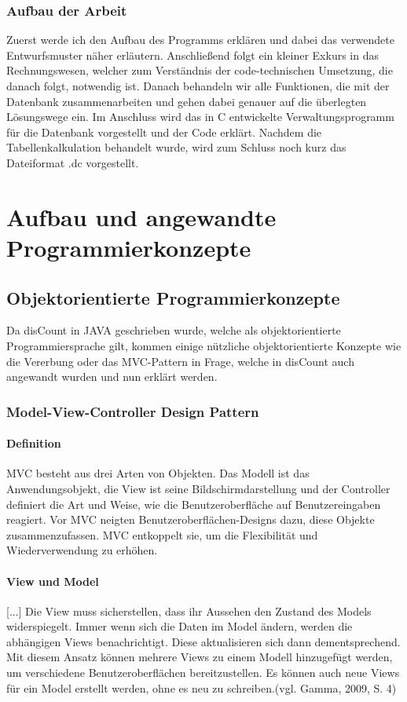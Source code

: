 \documentclass[12pt]{report}
\begin{document}
\section{Aufbau der Arbeit}
Zuerst werde ich den Aufbau des Programms erklären und dabei das verwendete Entwurfsmuster näher erläutern. Anschließend folgt ein kleiner Exkurs in das Rechnungswesen, welcher zum Verständnis der code-technischen Umsetzung, die danach folgt, notwendig ist. Danach behandeln wir alle Funktionen, die mit der Datenbank zusammenarbeiten und gehen dabei genauer auf die überlegten Lösungswege ein. Im Anschluss wird das in C entwickelte Verwaltungsprogramm für die Datenbank vorgestellt und der Code erklärt. Nachdem die Tabellenkalkulation behandelt wurde, wird zum Schluss noch kurz das Dateiformat .dc vorgestellt.


\part{Aufbau und angewandte Programmierkonzepte}
 
\chapter{Objektorientierte Programmierkonzepte}
  
Da disCount in JAVA geschrieben wurde, welche als objektorientierte Programmiersprache gilt, kommen einige nützliche objektorientierte Konzepte wie die Vererbung oder das MVC-Pattern in Frage, welche in disCount auch angewandt wurden und nun erklärt werden.
  
  
\section{Model-View-Controller Design Pattern}
 
\subsection{Definition}
MVC besteht aus drei Arten von Objekten. Das Modell ist das Anwendungsobjekt, die View ist seine Bildschirmdarstellung und der Controller definiert die Art und Weise, wie die Benutzeroberfläche auf Benutzereingaben reagiert. Vor MVC neigten Benutzeroberflächen-Designs dazu, diese Objekte zusammenzufassen. MVC entkoppelt sie, um die Flexibilität und Wiederverwendung zu erhöhen.

\subsection{View und Model}
[...] Die View muss sicherstellen, dass ihr Aussehen den Zustand des Models widerspiegelt. Immer wenn sich die Daten im Model ändern, werden die abhängigen Views benachrichtigt. Diese aktualisieren sich dann dementsprechend. Mit diesem Ansatz können mehrere Views zu einem Modell hinzugefügt werden, um verschiedene Benutzeroberflächen bereitzustellen. Es können auch neue Views für ein Model erstellt werden, ohne es neu zu schreiben.(vgl. Gamma, 2009,  S. 4\nocite{DPGOF})\\
\end{document}
